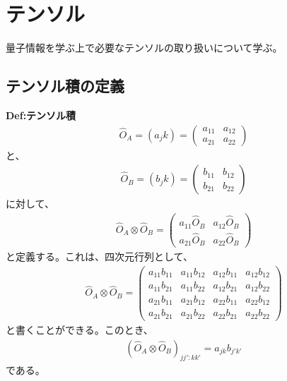 \documentclass[a4paper,11pt]{jsarticle}
\begin{document}
\section{テンソル}
量子情報を学ぶ上で必要なテンソルの取り扱いについて学ぶ。

\subsection{テンソル積の定義}
\begin{itembox}[l]{\textbf{Def:テンソル積}}
    \begin{align}
        \hat{O}_A =(a_jk) =
        \begin{pmatrix}
            a_{11} & a_{12} \\
            a_{21} & a_{22}
        \end{pmatrix}
    \end{align}
    と、
    \begin{align}
        \hat{O}_B =(b_jk) =
        \begin{pmatrix}
            b_{11} & b_{12} \\
            b_{21} & b_{22}
        \end{pmatrix}
    \end{align}
    に対して、
    \begin{align}
        \hat{O}_A \otimes \hat{O}_B =
        \begin{pmatrix}
            a_{11}\hat{O}_B & a_{12}\hat{O}_B \\
            a_{21}\hat{O}_B & a_{22}\hat{O}_B
        \end{pmatrix}
    \end{align}
    と定義する。これは、四次元行列として、
    \begin{align}
        \hat{O}_A \otimes \hat{O}_B =
        \begin{pmatrix}
            a_{11}b_{11} & a_{11}b_{12} & a_{12}b_{11} & a_{12}b_{12} \\
            a_{11}b_{21} & a_{11}b_{22} & a_{12}b_{21} & a_{12}b_{22} \\
            a_{21}b_{11} & a_{21}b_{12} & a_{22}b_{11} & a_{22}b_{12} \\
            a_{21}b_{21} & a_{21}b_{22} & a_{22}b_{21} & a_{22}b_{22}
        \end{pmatrix}
    \end{align}
    と書くことができる。このとき、
    \begin{align}
        (\hat{O}_A \otimes \hat{O}_B)_{jj':kk'} = a_{jk}b_{j'k'}
    \end{align}
    である。

\end{itembox}
\end{document}
